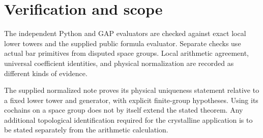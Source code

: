 \documentclass[11pt]{article}
\begin{document}
\section{Verification and scope}
The independent Python and GAP evaluators are checked against exact
local lower towers and the supplied public formula evaluator. Separate
checks use actual bar primitives from disputed space groups. Local
arithmetic agreement, universal coefficient identities, and physical
normalization are recorded as different kinds of evidence.

The supplied normalized note proves its physical uniqueness statement
relative to a fixed lower tower and generator, with explicit finite-group
hypotheses. Using its cochains on a space group does not by itself extend
the stated theorem. Any additional topological identification required
for the crystalline application is to be stated separately from the
arithmetic calculation.
\end{document}
